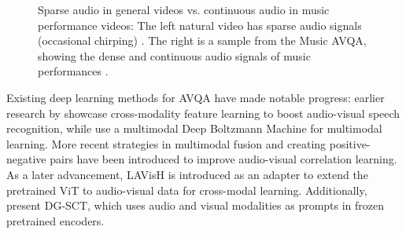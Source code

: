 \documentclass[11pt]{article}
\begin{document}
\begin{figure}[tb]
\centering
{}
\caption{Sparse audio in general videos vs. continuous audio in music performance videos: The left natural video has sparse audio signals (occasional chirping) \cite{9053174}.
The right is a sample from the Music AVQA, showing the dense and continuous audio signals of music performances \cite{li2022learning}.}
\label{fig:teaser}
\vspace{-0.5cm}
\end{figure}

Existing deep learning methods for AVQA have made notable progress: earlier research by \citet{ngiam2011multimodal} showcase cross-modality feature learning to boost audio-visual speech recognition, while \citet{srivastava2012multimodal} use a multimodal Deep Boltzmann Machine for multimodal learning. More recent strategies in multimodal fusion \cite{yun2021pano, yang2022avqa} and creating positive-negative pairs \cite{li2022learning} have been introduced to improve audio-visual correlation learning. As a later advancement, LAVisH \cite{lin2023vision} is introduced as an adapter to extend the pretrained ViT \cite{dosovitskiy2020image} to audio-visual data for cross-modal learning. Additionally, \citet{duan2024cross} present DG-SCT, which uses audio and visual modalities as prompts in frozen pretrained encoders.
\end{document}

